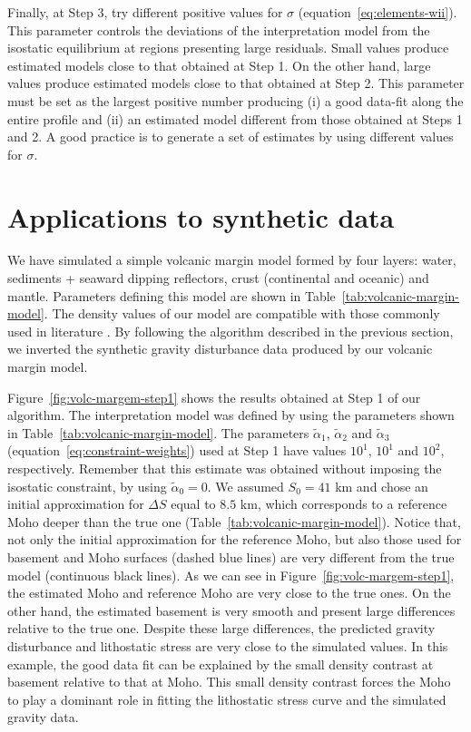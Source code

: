 \documentclass[manuscript]{geophysics}
\begin{document}
Finally, at Step 3, try different positive values for $\sigma$ (equation~\ref{eq:elements-wii}).
This parameter controls the deviations of the interpretation model from the
isostatic equilibrium at regions presenting large residuals.
Small values produce estimated models close to that obtained at Step 1.
On the other hand, large values produce estimated models close to that
obtained at Step 2.
This parameter must be set as the largest positive number producing (i) a good data-fit
along the entire profile and (ii) an estimated model different from those obtained
at Steps 1 and 2.
A good practice is to generate a set of estimates by using different values for $\sigma$. 


\section{Applications to synthetic data}


We have simulated a simple volcanic margin model formed by four layers: 
water, sediments + seaward dipping reflectors, crust (continental and oceanic) 
and mantle. 
Parameters defining this model are shown in Table~\ref{tab:volcanic-margin-model}.
The density values of our model are compatible with those commonly used in literature
\citep[e.g., ][]{gradmann-etal2017}.
By following the algorithm described in the previous section, we inverted the synthetic 
gravity disturbance data produced by our volcanic margin model.

Figure~\ref{fig:volc-margem-step1} shows the results obtained at Step 1 of our
algorithm.
The interpretation model was defined by using the parameters shown in
Table~\ref{tab:volcanic-margin-model}.
The parameters $\tilde{\alpha}_{1}$, $\tilde{\alpha}_{2}$ and 
$\tilde{\alpha}_{3}$ (equation~\ref{eq:constraint-weights}) used at Step 1 
have values $10^{1}$, $10^{1}$ and $10^{2}$, respectively.
Remember that this estimate was obtained without imposing the 
isostatic constraint, by using $\tilde{\alpha}_{0} = 0$.
We assumed $S_{0} = 41$ km and chose an initial approximation for $\Delta S$
equal to $8.5$ km, which corresponds to a reference Moho deeper 
than the true one (Table~\ref{tab:volcanic-margin-model}).
Notice that, not only the initial approximation for the reference Moho,
but also those used for basement and Moho surfaces 
(dashed blue lines) are very different from
the true model (continuous black lines).
As we can see in Figure~\ref{fig:volc-margem-step1}, the estimated Moho and reference 
Moho are very close to the true ones.
On the other hand, the estimated basement is very smooth and present large differences
relative to the true one.
Despite these large differences, 
the predicted gravity disturbance and lithostatic stress 
are very close to the simulated values.
In this example, the good data fit can be explained by the small density contrast at basement
relative to that at Moho.
This small density contrast forces the Moho to play a dominant role in fitting the
lithostatic stress curve and the simulated gravity data.
\end{document}
